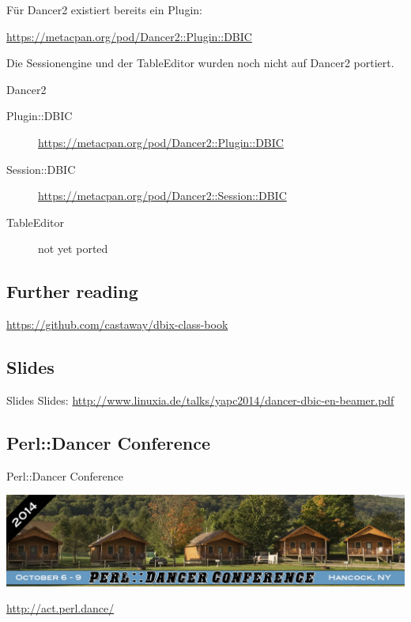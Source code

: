 Für Dancer2 existiert bereits ein Plugin:

\url{https://metacpan.org/pod/Dancer2::Plugin::DBIC}

Die Sessionengine und der TableEditor wurden noch nicht auf Dancer2 portiert.

\begin{frame}{Dancer2}
  \begin{description}
  \item[Plugin::DBIC] \url{https://metacpan.org/pod/Dancer2::Plugin::DBIC}
  \item[Session::DBIC] \url{https://metacpan.org/pod/Dancer2::Session::DBIC}
  \item[TableEditor] not yet ported
  \end{description}
\end{frame}


\subsection{Further reading}

\url{https://github.com/castaway/dbix-class-book}

\subsection{Slides}

\begin{frame}{Slides}
Slides:
\url{http://www.linuxia.de/talks/yapc2014/dancer-dbic-en-beamer.pdf}
\end{frame}

\subsection{Perl::Dancer Conference}

\begin{frame}{Perl::Dancer Conference}
\begin{center}
  \includegraphics[width=\textwidth,height=1\textheight,keepaspectratio]{images/perl-dancer.jpg}
\end{center}
\url{http://act.perl.dance/}
\end{frame}


